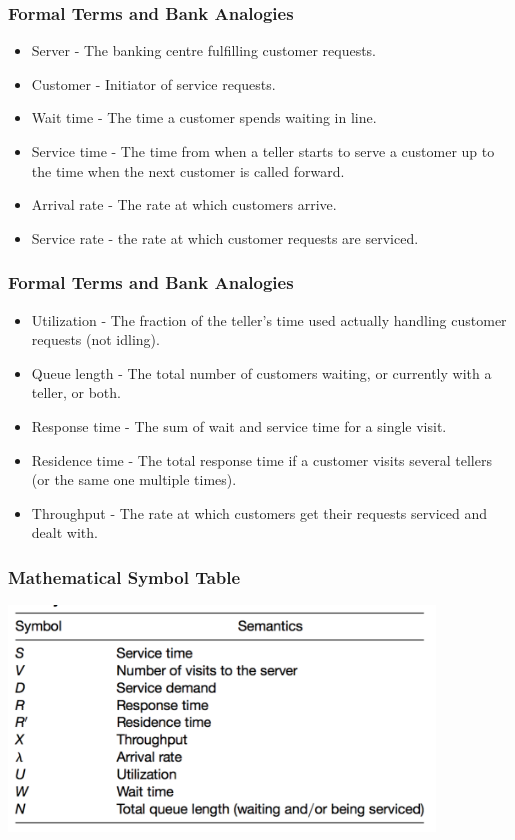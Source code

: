 \begin{frame}
\frametitle{Formal Terms and Bank Analogies}

\begin{itemize}
	\item Server - The banking centre fulfilling customer requests.
	\item Customer - Initiator of service requests.
	\item Wait time - The time a customer spends waiting in line.
	\item Service time - The time from when a teller starts to serve a customer up to the time when the next customer is called forward.
	\item Arrival rate - The rate at which customers arrive.
	\item Service rate - the rate at which customer requests are serviced.

\end{itemize}

\end{frame}



\begin{frame}
\frametitle{Formal Terms and Bank Analogies}

\begin{itemize}
	\item Utilization - The fraction of the teller's time used actually handling customer requests (not idling).
	\item Queue length - The total number of customers waiting, or currently with a teller, or both.
	\item Response time - The sum of wait and service time for a single visit.
	\item Residence time - The total response time if a customer visits several tellers (or the same one multiple times).
	\item Throughput - The rate at which customers get their requests serviced and dealt with.
\end{itemize}

\end{frame}



\begin{frame}
\frametitle{Mathematical Symbol Table}

\begin{center}
	\includegraphics[width=0.85\textwidth]{images/math-symbols.png}
\end{center}

\end{frame}



